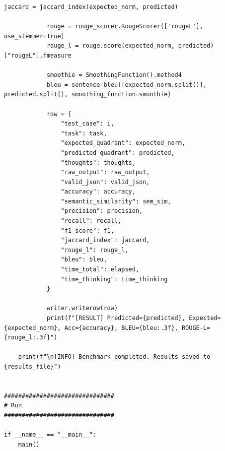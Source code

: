 \documentclass{report}
\begin{document}
\begin{lstlisting}[style=pythonstyle]
            jaccard = jaccard_index(expected_norm, predicted)

            rouge = rouge_scorer.RougeScorer(['rougeL'], use_stemmer=True)
            rouge_l = rouge.score(expected_norm, predicted)["rougeL"].fmeasure

            smoothie = SmoothingFunction().method4
            bleu = sentence_bleu([expected_norm.split()], predicted.split(), smoothing_function=smoothie)

            row = {
                "test_case": i,
                "task": task,
                "expected_quadrant": expected_norm,
                "predicted_quadrant": predicted,
                "thoughts": thoughts,
                "raw_output": raw_output,
                "valid_json": valid_json,
                "accuracy": accuracy,
                "semantic_similarity": sem_sim,
                "precision": precision,
                "recall": recall,
                "f1_score": f1,
                "jaccard_index": jaccard,
                "rouge_l": rouge_l,
                "bleu": bleu,
                "time_total": elapsed,
                "time_thinking": time_thinking
            }

            writer.writerow(row)
            print(f"[RESULT] Predicted={predicted}, Expected={expected_norm}, Acc={accuracy}, BLEU={bleu:.3f}, ROUGE-L={rouge_l:.3f}")

    print(f"\n[INFO] Benchmark completed. Results saved to {results_file}")


###############################
# Run
###############################

if __name__ == "__main__":
    main()

\end{lstlisting}
\end{document}
